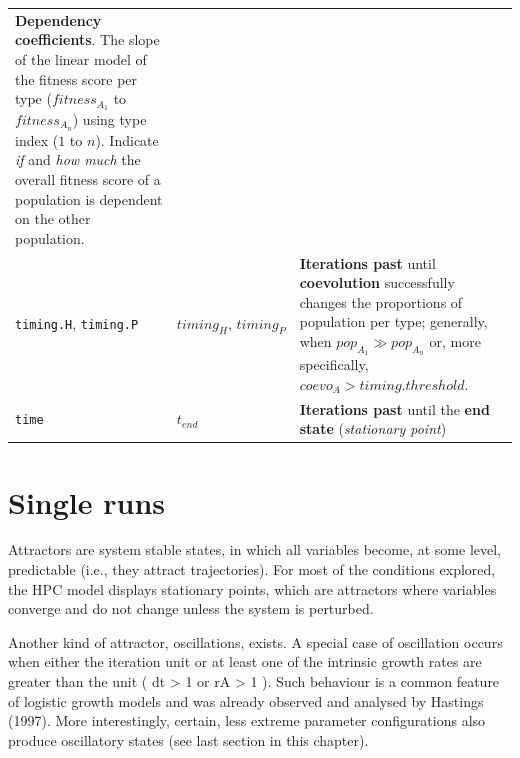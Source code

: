 \documentclass[]{book}
\begin{document}
\begin{longtable}[]{@{}lll@{}}
\begin{minipage}[t]{0.34\columnwidth}
\textbf{Dependency coefficients}. The slope of the linear model of the fitness score per type (\(fitness_{A_1}\) to \(fitness_{A_n}\)) using type index (\(1\) to \(n\)). Indicate \emph{if} and \emph{how much} the overall fitness score of a population is dependent on the other population.\strut
\end{minipage}\tabularnewline
\begin{minipage}[t]{0.36\columnwidth}\raggedright
\texttt{timing.H}, \texttt{timing.P}\strut
\end{minipage} & \begin{minipage}[t]{0.21\columnwidth}\raggedright
\(timing_{H},\,timing_{P}\)\strut
\end{minipage} & \begin{minipage}[t]{0.34\columnwidth}\raggedright
\textbf{Iterations past} until \textbf{coevolution} successfully changes the proportions of population per type; generally, when \(pop_{A_1}\gg pop_{A_n}\) or, more specifically, \(coevo_A>timing.threshold\).\strut
\end{minipage}\tabularnewline
\begin{minipage}[t]{0.36\columnwidth}\raggedright
\texttt{time}\strut
\end{minipage} & \begin{minipage}[t]{0.21\columnwidth}\raggedright
\(t_{end}\)\strut
\end{minipage} & \begin{minipage}[t]{0.34\columnwidth}\raggedright
\textbf{Iterations past} until the \textbf{end state} (\emph{stationary point})\strut
\end{minipage}\tabularnewline
\bottomrule
\end{longtable}

\hypertarget{single-runs}{%
\chapter{Single runs}\label{single-runs}}

Attractors are system stable states, in which all variables become, at some level, predictable (i.e., they attract trajectories). For most of the conditions explored, the HPC model displays stationary points, which are attractors where variables converge and do not change unless the system is perturbed.

Another kind of attractor, oscillations, exists. A special case of oscillation occurs when either the iteration unit or at least one of the intrinsic growth rates are greater than the unit ( dt \textgreater{} 1 or rA \textgreater{} 1 ). Such behaviour is a common feature of logistic growth models and was already observed and analysed by Hastings (1997). More interestingly, certain, less extreme parameter configurations also produce oscillatory states (see last section in this chapter).
\end{document}
